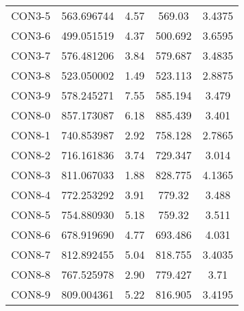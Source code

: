 \begin{table}[ht]
\begin{tabular}{c c c c c}
CON3-5 & 563.696744 & 4.57 & 569.03 & 3.4375 \\
CON3-6 & 499.051519 & 4.37 & 500.692 & 3.6595 \\
CON3-7 & 576.481206 & 3.84 & 579.687 & 3.4835 \\
CON3-8 & 523.050002 & 1.49 & 523.113 & 2.8875 \\
CON3-9 & 578.245271 & 7.55 & 585.194 & 3.479 \\
CON8-0 & 857.173087 & 6.18 & 885.439 & 3.401 \\
CON8-1 & 740.853987 & 2.92 & 758.128 & 2.7865 \\
CON8-2 & 716.161836 & 3.74 & 729.347 & 3.014 \\
CON8-3 & 811.067033 & 1.88 & 828.775 & 4.1365 \\
CON8-4 & 772.253292 & 3.91 & 779.32 & 3.488 \\
CON8-5 & 754.880930 & 5.18 & 759.32 & 3.511 \\
CON8-6 & 678.919690 & 4.77 & 693.486 & 4.031 \\
CON8-7 & 812.892455 & 5.04 & 818.755 & 3.4035 \\
CON8-8 & 767.525978 & 2.90 & 779.427 & 3.71 \\
CON8-9 & 809.004361 & 5.22 & 816.905 & 3.4195 \\
[1ex]\hline
\end{tabular}
\label{table:nonlin}
\end{table} \clearpage
